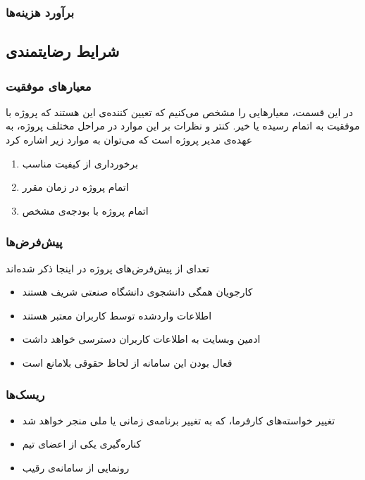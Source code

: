 \subsubsection{برآورد هزینه‌ها}


\begin{table}
\centering
{}
\end{table}


\subsection{شرایط رضایتمندی}
\subsubsection{معیار‌های موفقیت}
در این قسمت، معیار‌هایی را مشخص می‌کنیم که تعیین کننده‌ی این هستند که پروژه با موفقیت به اتمام رسیده یا خیر. کنتر و نظرات بر این موارد در مراحل مختلف پروژه، به عهده‌ی مدیر پروژه است که می‌توان به موارد زیر اشاره کرد
\begin{enumerate}
    \item برخورداری از کیفیت مناسب
    \item اتمام پروژه در زمان مقرر
    \item اتمام پروژه با بودجه‌ی مشخص
\end{enumerate}
\subsubsection{پیش‌فرض‌ها}
تعدای از پیش‌فرض‌های پروژه در اینجا ذکر شده‌اند
\begin{itemize}
    \item کارجویان همگی دانشجوی دانشگاه صنعتی شریف هستند
    \item اطلاعات واردشده توسط کاربران معتبر هستند
    \item ادمین وبسایت به اطلاعات کاربران دسترسی خواهد داشت
    \item فعال بودن این سامانه از لحاظ حقوقی بلامانع است
\end{itemize}
\subsubsection{ریسک‌ها}
\begin{itemize}
    \item تغییر خواسته‌های کارفرما، که به تغییر برنامه‌ی زمانی یا ملی منجر خواهد شد
    \item کناره‌گیری یکی از اعضای تیم
    \item رونمایی از سامانه‌ی رقیب
\end{itemize}
